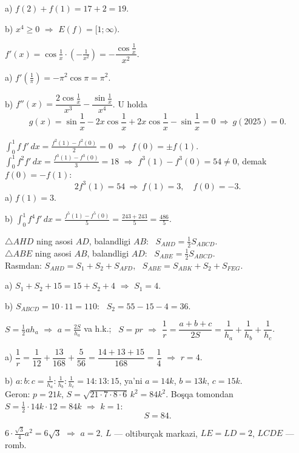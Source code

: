 a) $f(2)+f(1)=17+2=19$.

b) $x^4\ge0$ $\Rightarrow$ $E(f)=[1;\infty)$.
\Javob{a) 19; \quad b) $[1;\infty)$}

\newpage
{}
$f'(x)=\cos\frac1x\cdot\left(-\frac1{x^2}\right)=-\dfrac{\cos\frac1x}{x^2}$.

a) $f'\left(\frac1\pi\right)=-\pi^2\cos\pi=\pi^2$.

b) $f''(x)=\dfrac{2\cos\frac1x}{x^3}-\dfrac{\sin\frac1x}{x^4}$. U holda
\[g(x)=\sin\frac1x-2x\cos\frac1x+2x\cos\frac1x-\sin\frac1x=0\ \Rightarrow\ g(2025)=0.\]

\newpage
{}
$\displaystyle\int_0^1f\,f'\,dx=\frac{f^2(1)-f^2(0)}2=0$ $\Rightarrow$ $f(0)=\pm f(1)$.\\
$\displaystyle\int_0^1f^2f'\,dx=\frac{f^3(1)-f^3(0)}3=18$ $\Rightarrow$ $f^3(1)-f^3(0)=54\ne0$, demak $f(0)=-f(1)$:
\[2f^3(1)=54\ \Rightarrow\ f(1)=3,\quad f(0)=-3.\]
a) $f(1)=3$.

b) $\displaystyle\int_0^1f^4f'\,dx=\frac{f^5(1)-f^5(0)}5=\frac{243+243}5=\frac{486}5$.

\newpage
{}
$\triangle AHD$ ning asosi $AD$, balandligi $AB$: \ $S_{AHD}=\frac12S_{ABCD}$.\\
$\triangle ABE$ ning asosi $AB$, balandligi $AD$: \ $S_{ABE}=\frac12S_{ABCD}$.\\
Rasmdan: $S_{AHD}=S_1+S_2+S_{AFD}$, \ $S_{ABE}=S_{ABK}+S_2+S_{FEG}$.

a) $S_1+S_2+15=15+S_2+4$ $\Rightarrow$ $S_1=4$.

b) $S_{ABCD}=10\cdot11=110$: \ $S_2=55-15-4=36$.

\newpage
{}
$S=\frac12ah_a$ $\Rightarrow$ $a=\frac{2S}{h_a}$ va h.k.; \ $S=pr$ $\Rightarrow$ $\dfrac1r=\dfrac{a+b+c}{2S}=\dfrac1{h_a}+\dfrac1{h_b}+\dfrac1{h_c}$.

a) $\dfrac1r=\dfrac1{12}+\dfrac{13}{168}+\dfrac5{56}=\dfrac{14+13+15}{168}=\dfrac14$ $\Rightarrow$ $r=4$.

b) $a:b:c=\frac1{h_a}:\frac1{h_b}:\frac1{h_c}=14:13:15$, ya'ni $a=14k$, $b=13k$, $c=15k$.\\
Geron: $p=21k$, $S=\sqrt{21\cdot7\cdot8\cdot6}\,k^2=84k^2$. Boşqa tomondan $S=\frac12\cdot14k\cdot12=84k$ $\Rightarrow$ $k=1$:
\[S=84.\]

\newpage
{}
$6\cdot\frac{\sqrt3}4a^2=6\sqrt3$ $\Rightarrow$ $a=2$. $L$ — oltiburçak markazi, $LE=LD=2$, $LCDE$ — romb.


